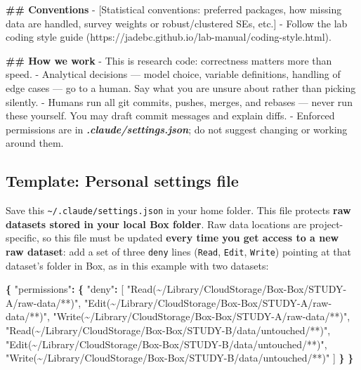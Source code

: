 \documentclass[
]{book}
\newenvironment{Shaded}{\begin{snugshade}}{\end{snugshade}}
\newcommand{\DataTypeTok}[1]{\textcolor[rgb]{0.13,0.29,0.53}{#1}}
\newcommand{\FunctionTok}[1]{\textcolor[rgb]{0.13,0.29,0.53}{\textbf{#1}}}
\newcommand{\InformationTok}[1]{\textcolor[rgb]{0.56,0.35,0.01}{\textbf{\textit{#1}}}}
\newcommand{\NormalTok}[1]{#1}
\newcommand{\OtherTok}[1]{\textcolor[rgb]{0.56,0.35,0.01}{#1}}
\newcommand{\SpecialStringTok}[1]{\textcolor[rgb]{0.31,0.60,0.02}{#1}}
\newcommand{\StringTok}[1]{\textcolor[rgb]{0.31,0.60,0.02}{#1}}
\begin{document}
\begin{Shaded}
\begin{Highlighting}[]
\FunctionTok{\#\# Conventions}
\SpecialStringTok{{-} }\NormalTok{[Statistical conventions: preferred packages, how missing data are}
\NormalTok{  handled, survey weights or robust/clustered SEs, etc.]}
\SpecialStringTok{{-} }\NormalTok{Follow the lab coding style guide}
\NormalTok{  (https://jadebc.github.io/lab{-}manual/coding{-}style.html).}

\FunctionTok{\#\# How we work}
\SpecialStringTok{{-} }\NormalTok{This is research code: correctness matters more than speed.}
\SpecialStringTok{{-} }\NormalTok{Analytical decisions — model choice, variable definitions, handling}
\NormalTok{  of edge cases — go to a human. Say what you are unsure about rather}
\NormalTok{  than picking silently.}
\SpecialStringTok{{-} }\NormalTok{Humans run all git commits, pushes, merges, and rebases — never run}
\NormalTok{  these yourself. You may draft commit messages and explain diffs.}
\SpecialStringTok{{-} }\NormalTok{Enforced permissions are in }\InformationTok{\textasciigrave{}.claude/settings.json\textasciigrave{}}\NormalTok{; do not suggest}
\NormalTok{  changing or working around them.}
\end{Highlighting}
\end{Shaded}

\subsection{Template: Personal settings file}\label{template-personal-settings-file}

Save this \texttt{\textasciitilde{}/.claude/settings.json} in your home folder. This file protects \textbf{raw datasets stored in your local Box folder}.
Raw data locations are project-specific, so this file must be updated
\textbf{every time you get access to a new raw dataset}: add a set of three
\texttt{deny} lines (\texttt{Read}, \texttt{Edit}, \texttt{Write}) pointing at that dataset's
folder in Box, as in this example with two datasets:

\begin{Shaded}
\begin{Highlighting}[]
\FunctionTok{\{}
  \DataTypeTok{"permissions"}\FunctionTok{:} \FunctionTok{\{}
    \DataTypeTok{"deny"}\FunctionTok{:} \OtherTok{[}
      \StringTok{"Read(\textasciitilde{}/Library/CloudStorage/Box{-}Box/STUDY{-}A/raw{-}data/**)"}\OtherTok{,}
      \StringTok{"Edit(\textasciitilde{}/Library/CloudStorage/Box{-}Box/STUDY{-}A/raw{-}data/**)"}\OtherTok{,}
      \StringTok{"Write(\textasciitilde{}/Library/CloudStorage/Box{-}Box/STUDY{-}A/raw{-}data/**)"}\OtherTok{,}
      \StringTok{"Read(\textasciitilde{}/Library/CloudStorage/Box{-}Box/STUDY{-}B/data/untouched/**)"}\OtherTok{,}
      \StringTok{"Edit(\textasciitilde{}/Library/CloudStorage/Box{-}Box/STUDY{-}B/data/untouched/**)"}\OtherTok{,}
      \StringTok{"Write(\textasciitilde{}/Library/CloudStorage/Box{-}Box/STUDY{-}B/data/untouched/**)"}
    \OtherTok{]}
  \FunctionTok{\}}
\FunctionTok{\}}
\end{Highlighting}
\end{Shaded}
\end{document}
